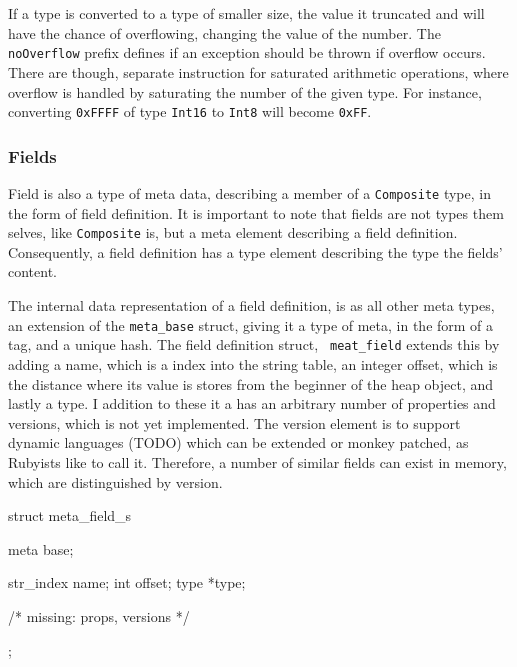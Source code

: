 If a type is converted to a type of smaller size, the value it truncated and
will have the chance of overflowing, changing the value of the number. The {\tt
  noOverflow} prefix defines if an exception should be thrown if overflow
occurs. There are though, separate instruction for saturated arithmetic
operations, where overflow is handled by saturating the number of the given
type. For instance, converting {\tt 0xFFFF} of type {\tt Int16} to {\tt Int8}
will become {\tt 0xFF}.


\subsubsection{Fields}

Field is also a type of meta data, describing a member of a {\tt Composite}
type, in the form of field definition. It is important to note that fields are
not types them selves, like {\tt Composite} is, but a meta element describing a
field definition. Consequently, a field definition has a type element describing
the type the fields' content.

The internal data representation of a field definition, is as all other meta
types, an extension of the {\tt meta\_base} struct, giving it a type of meta, in
the form of a tag, and a unique hash. The field definition struct, {\tt
  meat\_field} extends this by adding a name, which is a index into the string
table, an integer offset, which is the distance where its value is stores from
the beginner of the heap object, and lastly a type. I addition to these it a has
an arbitrary number of properties and versions, which is not yet
implemented. The version element is to support dynamic languages (TODO) which
can be extended or monkey patched, as Rubyists like to call it. Therefore, a
number of similar fields can exist in memory, which are distinguished by
version. %
\begin{ccode}
struct meta_field_s {
    meta base;

    str_index name;
    int offset;
    type *type;

    /* missing: props, versions */
};
\end{ccode}

